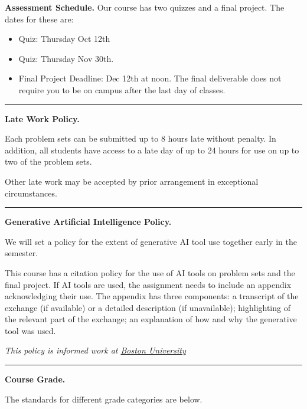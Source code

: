 \documentclass[12pt,letterpaper]{exam}
\begin{document}
\noindent\textbf{Assessment Schedule.}
Our course has two quizzes and a final project.  The dates for these are:
\begin{itemize}
\itemsep0pt
\item Quiz:	Thursday Oct 12th
\item Quiz:	Thursday Nov 30th.
\item Final Project Deadline: Dec 12th at noon.  The final deliverable does not require you to be on campus after the last day of classes.
\end{itemize}

\vspace{0.5cm}
\hrule
\vspace{0.5cm}

\noindent\textbf{Late Work Policy.}  

Each problem sets can be submitted up to 8 hours late without penalty.  In addition, all students have access to a late day of up to 24 hours for use on up to two of the problem sets.

Other late work may be accepted by prior arrangement in exceptional circumstances.

\vspace{0.5cm}
\hrule
\vspace{0.5cm}

\noindent\textbf{Generative Artificial Intelligence Policy.}  

We will set a policy for the extent of generative AI tool use together early in the semester.

This course has a citation policy for the use of AI tools on problem sets and the final project.  If AI tools are used, the assignment needs to include an appendix acknowledging their use. The appendix has three components: a transcript of the exchange (if available) or a detailed description (if unavailable); highlighting of the relevant part of the exchange; an explanation of how and why the generative tool was used.

\noindent\emph{This policy is informed work at \href{https://www.bu.edu/cds-faculty/2023/03/28/academic-unit-at-bu-adopts-guidelines-for-use-of-generative-ai/}{Boston University}}

\vspace{0.5cm}
\hrule
\vspace{0.5cm}

\noindent\textbf{Course Grade.}

\noindent The standards for different grade categories are below.
\vspace{0.2cm}
\end{document}
